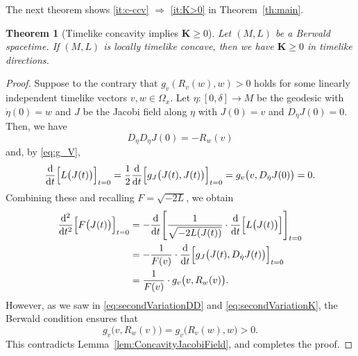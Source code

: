 \documentclass[a4paper,11pt]{article}
\numberwithin{equation}{section}
\theoremstyle{definition}
\theoremstyle{plain}
\newtheorem{theorem}[definition]{Theorem}
\newcommand{\lra}{\longrightarrow}
\newcommand{\bK}{\mathbf{K}}
\newcommand{\dd}{\mathrm{d}}
\begin{document}
The next theorem shows \eqref{it:c-ccv} $\Rightarrow$ \eqref{it:K>0} in Theorem~\ref{th:main}.

\begin{theorem}[Timelike concavity implies $\bK \ge 0$]\label{th:BNPC}
Let $(M,L)$ be a Berwald spacetime.
If $(M,L)$ is locally timelike concave, then we have $\bK \ge 0$ in timelike directions.
\end{theorem}

\begin{proof}
Suppose to the contrary that $g_v(R_v(w),w) > 0$ holds for some linearly independent timelike vectors $v, w \in \Omega_x$.
Let $\eta\colon [0,\delta] \lra M$ be the geodesic with $\dot{\eta}(0) = w$
and $J$ be the Jacobi field along $\eta$ with $J(0) = v$ and $D_{\dot{\eta}} J(0) =0$.
Then, we have
\[ D_{\dot{\eta}} D_{\dot{\eta}} J(0) =-R_w(v) \]
and, by \eqref{eq:g_V},
\[ \frac{\dd}{\dd t} \Bigl[ L\bigl( J(t) \bigr) \Bigr]_{t=0}
 = \frac{1}{2} \frac{\dd}{\dd t} \Bigl[ g_J\bigl( J(t),J(t) \bigr) \Bigr]_{t=0}
 = g_v \bigl( v,D_{\dot{\eta}} J(0) \bigr) =0. \]
Combining these and recalling $F=\sqrt{-2L}$, we obtain
\begin{align*}
\frac{\dd^2}{\dd t^2}\Bigl[ F\bigl( J(t) \bigr) \Bigr]_{t=0}
&= -\frac{\dd}{\dd t} \Biggl[ \frac{1}{\sqrt{-2L(J(t))}} \cdot \frac{\dd}{\dd t} \Bigl[ L\bigl( J(t) \bigr) \Bigr] \Biggr]_{t=0} \\
&= -\frac{1}{F(v)} \cdot \frac{\dd}{\dd t} \Bigl[ g_J \bigl( J(t),D_{\dot{\eta}} J(t) \bigr) \Bigr]_{t=0} \\
&= \frac{1}{F(v)} \cdot g_v \bigl( v,R_w(v) \bigr).
\end{align*}
However, as we saw in \eqref{eq:secondVariationDD} and \eqref{eq:secondVariationK}, the Berwald condition ensures that
\[ g_v \bigl( v,R_w(v) \bigr) =g_v \bigl( R_v(w),w \bigr) >0. \]
This contradicts Lemma~\ref{lem:ConcavityJacobiField}, and completes the proof.
\end{proof}
\end{document}
